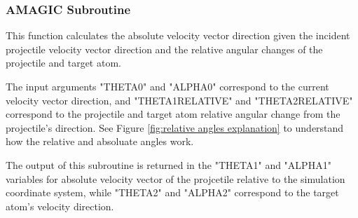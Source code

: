 \documentclass[10pt, reqno]{exam}
\begin{document}
\subsubsection{AMAGIC Subroutine}

This function calculates the absolute velocity vector direction given the incident projectile velocity vector direction and the relative angular changes of the projectile and target atom. \par

\vspace{0.5 cm}

The input arguments "THETA0" and "ALPHA0" correspond to the current velocity vector direction, and "THETA1RELATIVE" and "THETA2RELATIVE" correspond to the projectile and target atom relative angular change from the projectile's direction. See Figure \ref{fig:relative angles explanation} to understand how the relative and absoluate angles work. \par

\vspace{0.5 cm}

The output of this subroutine is returned in the "THETA1" and "ALPHA1" variables for absolute velocity vector of the projcetile relative to the simulation coordinate system, while "THETA2" and "ALPHA2" correspond to the target atom's velocity direction. \par
\end{document}
